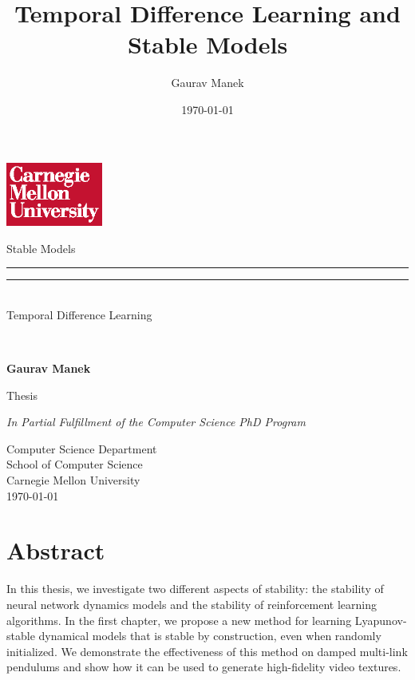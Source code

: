 \documentclass[11pt]{book}
\title{ Temporal Difference Learning and Stable Models }
\author{ Gaurav Manek }
\date{\today}
\begin{document}
\frontmatter

\begin{titlepage}
	{
		\hfill\includegraphics[width=1.25in,trim=0 0 .125in .25in]{cmu/cmu-wordmark-square-w-on-r}
	}
	\begin{center}{%
		\vfill

		{\Huge%
		{
		{Stable Models}\\[-.75em]
		\rule{0.25\textwidth}{1pt}
		\rule{0.25\textwidth}{1pt}\\[.5em]
		{Temporal Difference Learning}
		}
		}\\


		\vspace{0.25in}

		\textbf{\large Gaurav Manek}\\

		\vfill

		Thesis

		\textit{In Partial Fulfillment of the Computer Science PhD Program}

		\vspace{0.33in}
		Computer Science Department\\
		School of Computer Science\\
		Carnegie Mellon University\\
		\today

		}\end{center}
\end{titlepage}

\cleardoublepage

\chapter{Abstract}

In this thesis, we investigate two different aspects of stability: the stability of neural network dynamics models and the stability of reinforcement learning algorithms. In the first chapter, we propose a new method for learning Lyapunov-stable dynamical models that is stable by construction, even when randomly initialized. We demonstrate the effectiveness of this method on damped multi-link pendulums and show how it can be used to generate high-fidelity video textures.
\end{document}
